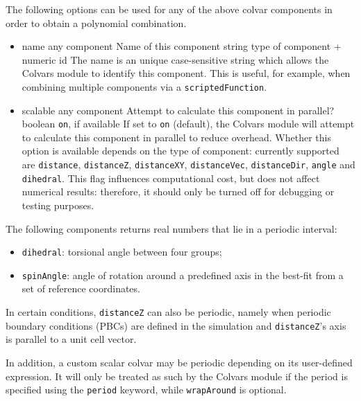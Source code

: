 The following options can be used for any of the above colvar components in order to obtain a polynomial combination.
\begin{itemize}
\item %
  \keydef
    {name}{%
    any component}{%
    Name of this component}{%
    string}{%
    type of component + numeric id}{%
    The name is an unique case-sensitive string which allows the
    Colvars module to identify this component. This is useful, for example,
    when combining multiple components via a \texttt{scriptedFunction}.
    }

\item %
  \keydef
    {scalable}{%
    any component}{%
    Attempt to calculate this component in parallel?}{%
    boolean}{%
    \texttt{on}, if available}{%
    If set to \texttt{on} (default), the Colvars module will attempt to calculate this component in parallel to reduce overhead.
    Whether this option is available depends on the type of component: currently supported are \texttt{distance}, \texttt{distanceZ}, \texttt{distanceXY}, \texttt{distanceVec}, \texttt{distanceDir}, \texttt{angle} and \texttt{dihedral}.
    This flag influences computational cost, but does not affect numerical results: therefore, it should only be turned off for debugging or testing purposes.
  }
\end{itemize}


The following components returns
real numbers that lie in a periodic interval:
\begin{itemize}
\item \texttt{dihedral}: torsional angle between four groups;
\item \texttt{spinAngle}: angle of rotation around a predefined axis
  in the best-fit from a set of reference coordinates.
\end{itemize}
In certain conditions, \texttt{distanceZ} can also be periodic, namely
when periodic boundary conditions (PBCs) are defined in the simulation
and \texttt{distanceZ}'s axis is parallel to a unit cell vector.

In addition, a custom  scalar colvar may be periodic
depending on its user-defined expression. It will only be treated as such by
the Colvars module if the period is specified using the \texttt{period} keyword,
while \texttt{wrapAround} is optional.

